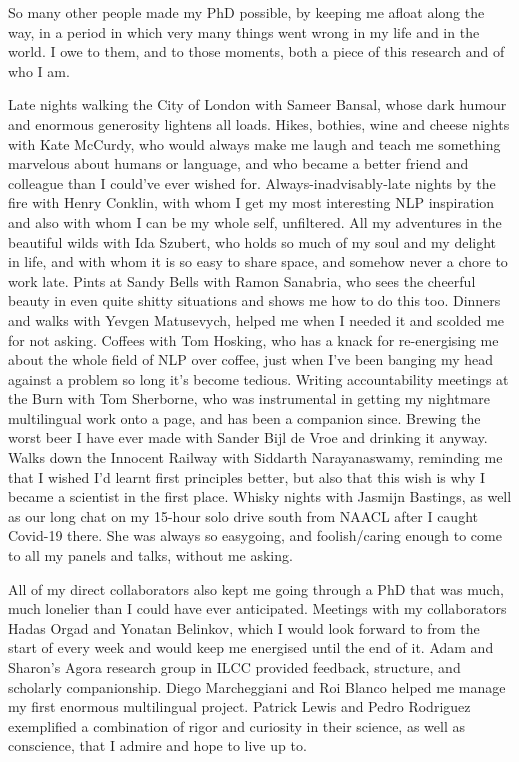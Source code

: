 \documentclass[phd,ilcc,oneside,leftchapter,parskip]{infthesis}
\begin{document}
\begin{preliminary}
\begin{acknowledgements}
So many other people made my PhD possible, by keeping me afloat along the way, in a period in which very many things went wrong in my life and in the world. I owe to them, and to those moments, both a piece of this research and of who I am. 

Late nights walking the City of London with Sameer Bansal, whose dark humour and enormous generosity lightens all loads. Hikes, bothies, wine and cheese nights with Kate McCurdy, who would always make me laugh and teach me something marvelous about humans or language, and who became a better friend and colleague than I could've ever wished for. Always-inadvisably-late nights by the fire with Henry Conklin, with whom I get my most interesting NLP inspiration and also with whom I can be my whole self, unfiltered. All my adventures in the beautiful wilds with Ida Szubert, who holds so much of my soul and my delight in life, and with whom it is so easy to share space, and somehow never a chore to work late. Pints at Sandy Bells with Ramon Sanabria, who sees the cheerful beauty in even quite shitty situations and shows me how to do this too. Dinners and walks with Yevgen Matusevych, helped me when I needed it and scolded me for not asking. Coffees with Tom Hosking, who has a knack for re-energising me about the whole field of NLP over coffee, just when I've been banging my head against a problem so long it's become tedious. Writing accountability meetings at the Burn with Tom Sherborne, who was instrumental in getting my nightmare multilingual work onto a page, and has been a companion since. Brewing the worst beer I have ever made with Sander Bijl de Vroe and drinking it anyway. Walks down the Innocent Railway with Siddarth Narayanaswamy, reminding me that I wished I'd learnt first principles better, but also that this wish is why I became a scientist in the first place. Whisky nights with Jasmijn Bastings, as well as our long chat on my 15-hour solo drive south from NAACL after I caught Covid-19 there. She was always so easygoing, and foolish/caring enough to come to all my panels and talks, without me asking. 

All of my direct collaborators also kept me going through a PhD that was much, much lonelier than I could have ever anticipated. Meetings with my collaborators Hadas Orgad and Yonatan Belinkov, which I would look forward to from the start of every week and would keep me energised until the end of it.  Adam and Sharon's Agora research group in ILCC provided feedback, structure, and scholarly companionship. Diego Marcheggiani and Roi Blanco helped me manage my first enormous multilingual project. Patrick Lewis and Pedro Rodriguez exemplified a combination of rigor and curiosity in their science, as well as conscience, that I admire and hope to live up to. 


\end{acknowledgements}
\end{preliminary}
\end{document}
